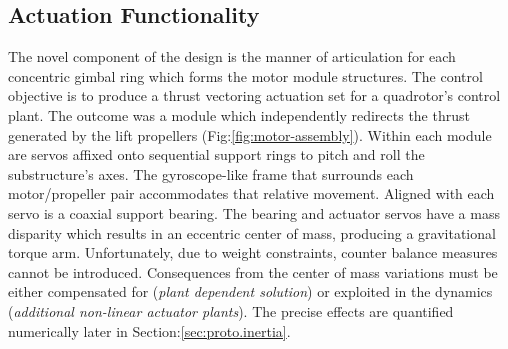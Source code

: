 \subsection{Actuation Functionality}
\label{subsec:proto.design.actuation}
The novel component of the design is the manner of articulation for each concentric gimbal ring which forms the motor module structures. The control objective is to produce a thrust vectoring actuation set for a quadrotor's control plant. The outcome was a module which independently redirects the thrust generated by the lift propellers (Fig:\ref{fig:motor-assembly}). Within each module are servos affixed onto sequential support rings to pitch and roll the substructure's axes. The gyroscope-like frame that surrounds each motor/propeller pair accommodates that relative movement. Aligned with each servo is a coaxial support bearing. The bearing and actuator servos have a mass disparity which results in an eccentric center of mass, producing a gravitational torque arm. Unfortunately, due to weight constraints, counter balance measures cannot be introduced. Consequences from the center of mass variations must be either compensated for (\emph{plant dependent solution}) or exploited in the dynamics (\emph{additional non-linear actuator plants}). The precise effects are quantified numerically later in Section:\ref{sec:proto.inertia}.
\par
